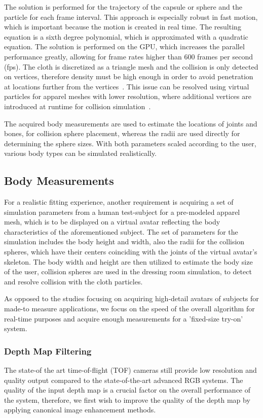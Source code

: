 \documentclass[number,preprint,review,12pt]{elsarticle}
\begin{document}
The solution is performed for the trajectory of the capsule or sphere and the particle for each frame interval. This approach is especially robust in fast motion, which is important because the motion is created in real time. The resulting equation is a sixth degree polynomial, which is approximated with a quadratic equation. The solution is performed on the GPU, which increases the parallel performance greatly, allowing for frame rates higher than 600 frames per second (fps). The cloth is discretized as a triangle mesh and the collision is only detected on vertices, therefore density must be high enough in order to avoid penetration at locations further from the vertices~\cite{Kim2011,Tonge2010}. This issue can be resolved using virtual particles for apparel meshes with lower resolution, where additional vertices are introduced at runtime for collision simulation~\cite{Kim2011}.

The acquired body measurements are used to estimate the locations of joints and bones, for collision sphere placement, whereas the radii are used directly for determining the sphere sizes. With both parameters scaled according to the user, various body types can be simulated realistically.

\subsection{Body Measurements}
\label{subsec:Measurements}
For a realistic fitting experience, another requirement is acquiring a set of simulation parameters from a human test-subject for a pre-modeled apparel mesh, which is to be displayed on a virtual avatar reflecting the body characteristics of the aforementioned subject.  The set of parameters for the simulation includes the body height and width, also the radii for the collision spheres, which have their centers coinciding with the joints of the virtual avatar's skeleton.
The body width and height are then utilized to estimate the body size of the user, collision spheres are used in the dressing room simulation, to detect and resolve collision with the cloth particles.

As opposed to the studies focusing on acquiring high-detail avatars of subjects for made-to measure applications, we focus on the speed of the overall algorithm for real-time purposes and acquire enough measurements for a 'fixed-size try-on' system.   
  
\subsubsection{Depth Map Filtering}
\label{subsubsec:4.1} 
The state-of the art time-of-flight (TOF) cameras still provide low resolution and quality output compared to the state-of-the-art advanced RGB systems. The quality of the input depth map is a crucial factor on the overall performance of the system, therefore, we first wish to improve the quality of the depth map by applying canonical image enhancement methods.
\end{document}
